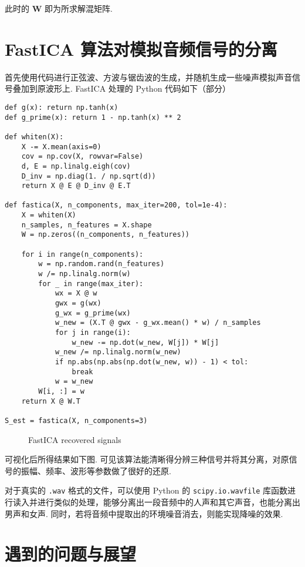 \documentclass{article}
\newcommand{\bs}[1]{\boldsymbol{#1}}
\newcommand{\np}{\indent\par}
\begin{document}
此时的 $\bs{W}$ 即为所求解混矩阵.

\section{FastICA 算法对模拟音频信号的分离}

首先使用代码进行正弦波、方波与锯齿波的生成，并随机生成一些噪声模拟声音信号叠加到原波形上. 
FastICA 处理的 Python 代码如下（部分）

\begin{verbatim}
def g(x): return np.tanh(x)
def g_prime(x): return 1 - np.tanh(x) ** 2

def whiten(X):
    X -= X.mean(axis=0)
    cov = np.cov(X, rowvar=False)
    d, E = np.linalg.eigh(cov)
    D_inv = np.diag(1. / np.sqrt(d))
    return X @ E @ D_inv @ E.T

def fastica(X, n_components, max_iter=200, tol=1e-4):
    X = whiten(X)
    n_samples, n_features = X.shape
    W = np.zeros((n_components, n_features))

    for i in range(n_components):
        w = np.random.rand(n_features)
        w /= np.linalg.norm(w)
        for _ in range(max_iter):
            wx = X @ w
            gwx = g(wx)
            g_wx = g_prime(wx)
            w_new = (X.T @ gwx - g_wx.mean() * w) / n_samples
            for j in range(i):
                w_new -= np.dot(w_new, W[j]) * W[j]
            w_new /= np.linalg.norm(w_new)
            if np.abs(np.abs(np.dot(w_new, w)) - 1) < tol:
                break
            w = w_new
        W[i, :] = w
    return X @ W.T

S_est = fastica(X, n_components=3)
\end{verbatim}

\begin{figure}[ht]
    \centering
    \raisebox{-1\height}{\resizebox{0.7\textwidth}{!}{}}
    \caption{FastICA recovered signals}
    \label{fig:fastica}
\end{figure}

可视化后所得结果如下图. 可见该算法能清晰得分辨三种信号并将其分离，对原信号的振幅、频率、波形等参数做了很好的还原. \np
对于真实的 \texttt{.wav} 格式的文件，可以使用 Python 的 \texttt{scipy.io.wavfile} 库函数进行读入并进行类似的处理，能够分离出一段音频中的人声和其它声音，也能分离出男声和女声. 同时，若将音频中提取出的环境噪音消去，则能实现降噪的效果.

\section{遇到的问题与展望}
\end{document}
